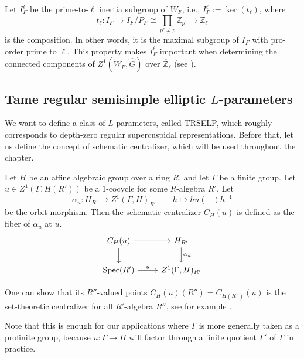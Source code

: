 	Let $I_F^{\ell}$ be the prime-to-$\ell$ inertia subgroup of $W_F$, i.e., $I_F^{\ell}:=\ker(t_{\ell})$, where 
	$$t_\ell: I_F \to I_F/P_F \cong \prod_{p' \neq p}\mathbb{Z}_{p'} \to \mathbb{Z}_\ell$$
	is the composition. In other words, it is the maximal subgroup of $I_F$ with pro-order prime to $\ell$. This property makes $I_F^{\ell}$ important when determining the connected components of $Z^1(W_F, \hat{G})$ over $\overline{\mathbb{Z}}_{\ell}$ (see \cite[Theorem 4.2 and Subsection 4.6]{dat2022ihes}). 
	
	\subsection{Tame regular semisimple elliptic $L$-parameters}\label{Subsection TRSELP}
	
	We want to define a class of $L$-parameters, called TRSELP, which roughly corresponds to depth-zero regular supercuspidal representations. Before that, let us define the concept of schematic centralizer, which will be used throughout the chapter.
	
	\begin{definition}\label{Definition: Schematic centralizer}
	Let $H$ be an affine algebraic group over a ring $R$, and let $\Gamma$ be a finite group. Let $u \in Z^1(\Gamma, H(R'))$ be a $1$-cocycle for some $R$-algebra $R'$. Let 
	$$\alpha_u: H_{R'} \longrightarrow Z^1(\Gamma, H)_{R'}\qquad h \longmapsto hu(-)h^{-1}$$
	 be the orbit morphism. Then the schematic centralizer $C_H(u)$ is defined as the fiber of $\alpha_u$ at $u$.
	$$	
	\begin{tikzcd}
		{C_H(u)} \arrow[r, ""] \arrow[d, ""] & {H_{R'}} \arrow[d, "{\alpha_u}"] \\
		{\Spec(R')} \arrow[r, "u"]                & {Z^1(\Gamma, H)_{R'}}               
	\end{tikzcd}
	$$	
	\end{definition}
	
	One can show that its $R''$-valued points $C_H(u)(R'')=C_{H(R'')}(u)$ is the set-theoretic centralizer for all $R'$-algebra $R''$, see for example \cite[Appendix A]{dhkm2020moduli}.
	
	\begin{remark}
			Note that this is enough for our applications where $\Gamma$ is more generally taken as a profinite group, because $u: \Gamma \to H$ will factor through a finite quotient $\Gamma'$ of $\Gamma$ in practice.
	\end{remark}
	
